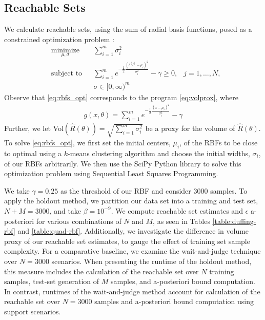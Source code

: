 \documentclass[letterpaper, 10 pt, conference]{ieeeconf}  %
\begin{document}
\subsection{Reachable Sets}
We calculate reachable sets, using the sum of radial basis functions, posed as a constrained optimization problem  \cite{pmlr-v242-dietrich24a}:
\begin{equation}
\label{eq:rbfs_opt}
\begin{aligned}
& \underset{\mu, \sigma}{\text{minimize}}
& & \sum^m_{i=1} \sigma_i^2\\
& \text{subject to}
& & \sum^m_{i=1} e^{-\frac{1}{2}\frac{(\delta^{(j)}- \mu_i)^2}{\sigma_i^2}}-\gamma \geq 0,& j=1,\dotsc,N,\\
& & & \sigma \in [0,\infty)^m
\end{aligned} 
\end{equation}
Observe that \eqref{eq:rbfs_opt}
corresponds to the program \eqref{eq:volprox}, where 
\begin{equation}
\begin{aligned}
\label{equ:grbf}
g(x,\theta) = \sum^m_{i=1} e^{-\frac{1}{2}\frac{(x - \mu_i)^2}
{\sigma_i^2}} - \gamma
\end{aligned}
\end{equation}
Further, we let Vol$(\hat{R}(\theta)) =\sqrt{\sum_{i=1}^{m} \sigma_i^2}$ be a proxy for the volume of $\hat{R}(\theta)$.
To solve \eqref{eq:rbfs_opt}, we first set the initial centers, $\mu_i$, of the RBFs to be close to optimal using a $k$-means clustering algorithm and choose the initial widths, $\sigma_i$, of our RBFs arbitrarily. We then use the SciPy Python library to solve this optimization problem using Sequential Least Squares Programming. 

We take $\gamma = 0.25$ as the threshold of our RBF and consider 3000 samples. To apply the holdout method, we partition our data set into a training and test set, $N + M = 3000$, and take $\beta = 10^{-9}$. We compute reachable set estimates and $\epsilon$ a-posteriori for various combinations of $N$ and $M$, as seen in Tables \ref{table:duffing-rbf} and \ref{table:quad-rbf}. Additionally, we investigate the difference in volume proxy of our reachable set estimates, to gauge the effect of training set sample complexity. For a comparative baseline, we examine the wait-and-judge technique over $N=3000$ scenarios. When presenting the runtime of the holdout method, this measure includes the calculation of the reachable set over $N$ training samples, test-set generation of $M$ samples, and a-posteriori bound computation. In contrast, runtimes of the wait-and-judge method account for calculation of the reachable set over $N = 3000$ samples and a-posteriori bound computation using support scenarios. 
\end{document}
